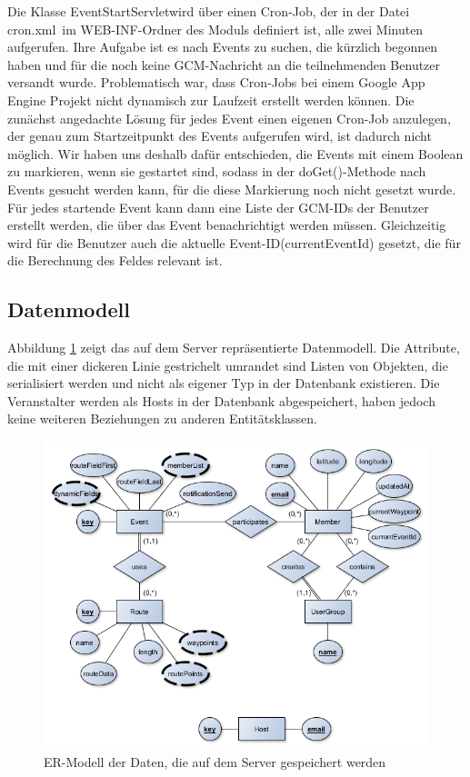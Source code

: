 Die Klasse \glqq EventStartServlet\grqq wird über einen Cron-Job, der in der Datei \glqq cron.xml\grqq\ im WEB-INF-Ordner des Moduls definiert ist, alle zwei Minuten aufgerufen. Ihre Aufgabe ist es nach Events zu suchen, die kürzlich begonnen haben und für die noch keine GCM-Nachricht an die teilnehmenden Benutzer versandt wurde. Problematisch war, dass Cron-Jobs bei einem Google App Engine Projekt nicht dynamisch zur Laufzeit erstellt werden können. Die zunächst angedachte Lösung für jedes Event einen eigenen Cron-Job anzulegen, der genau zum Startzeitpunkt des Events aufgerufen wird, ist dadurch nicht möglich. Wir haben uns deshalb dafür entschieden, die Events mit einem Boolean zu markieren, wenn sie gestartet sind, sodass in der \glqq doGet()\grqq -Methode nach Events gesucht werden kann, für die diese Markierung noch nicht gesetzt wurde. Für jedes startende Event kann dann eine Liste der GCM-IDs der Benutzer erstellt werden, die über das Event benachrichtigt werden müssen. Gleichzeitig wird für die Benutzer auch die aktuelle Event-ID(\glqq currentEventId\grqq) gesetzt, die für die Berechnung des Feldes relevant ist.

\subsection{Datenmodell}
Abbildung \ref{fig:backend_er} zeigt das auf dem Server repräsentierte Datenmodell. Die Attribute, die mit einer dickeren Linie gestrichelt umrandet sind Listen von Objekten, die serialisiert werden und nicht als eigener Typ in der Datenbank existieren. Die Veranstalter werden als Hosts in der Datenbank abgespeichert, haben jedoch keine weiteren Beziehungen zu anderen Entitätsklassen.

\begin{figure}[htb]
\includegraphics[width=\textwidth]{graphics/backend_er.png}
\caption{ER-Modell der Daten, die auf dem Server gespeichert werden}
\label{fig:backend_er}
\end{figure}

